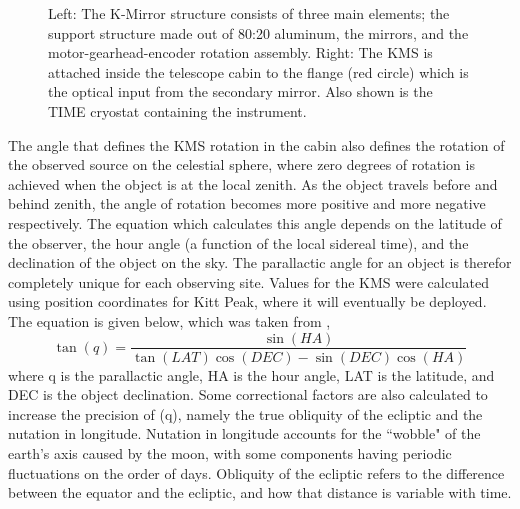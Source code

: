 \documentclass[manuscript]{aastex}
\begin{document}
\begin{figure}[H]
	\centering
	\qquad
	\singlespace
	\caption[CAD Model of the K-Mirror Structure.]{Left: The K-Mirror structure consists of three main elements; the support structure made out of 80:20 aluminum, the mirrors, and the motor-gearhead-encoder rotation assembly. Right: The KMS is attached inside the telescope cabin to the flange (red circle) which is the optical input from the secondary mirror. Also shown is the TIME cryostat containing the instrument.}%
	\label{fig:km23}%
\end{figure}

The angle that defines the KMS rotation in the cabin also defines the rotation of the observed source on the celestial sphere, where zero degrees of rotation is achieved when the object is at the local zenith. As the object travels before and behind zenith, the angle of rotation becomes more positive and more negative respectively. The equation which calculates this angle depends on the latitude of the observer, the hour angle (a function of the local sidereal time), and the declination of the object on the sky. The parallactic angle for an object is therefor completely unique for each observing site. Values for the KMS were calculated using position coordinates for Kitt Peak, where it will eventually be deployed. The equation is given below, which was taken from \cite{Meeus1998},
\begin{equation}\label{eq:parangle}
\tan(q) = \frac{\sin{(HA)}}{\tan(LAT)\cos{(DEC)} - \sin{(DEC)}\cos{(HA)}}
\end{equation}
where q is the parallactic angle, HA is the hour angle, LAT is the latitude, and DEC is the object declination. Some correctional factors are also calculated to increase the precision of (q), namely the true obliquity of the ecliptic and the nutation in longitude. Nutation in longitude accounts for the ``wobble" of the earth's axis caused by the moon, with some components having periodic fluctuations on the order of days. Obliquity of the ecliptic refers to the difference between the equator and the ecliptic, and how that distance is variable with time.
\end{document}
